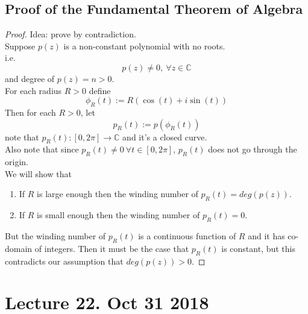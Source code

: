 \documentclass[11pt]{article}
\begin{document}
		\subsection{Proof of the Fundamental Theorem of Algebra}
		\begin{proof}
			Idea: prove by contradiction. \\
			Suppose $p(z)$ is a non-constant polynomial with no roots. \\
			i.e. 
			\[
				p(z) \neq 0,\ \forall z \in \mathbb{C}
			\]
			and degree of $p(z) = n > 0$. \\
			For each radius $R>0$ define 
			\[
				\phi_R(t) := R(\cos(t) + i \sin(t))
			\]
			Then for each $R>0$, let 
			\[
				p_R(t) := p(\phi_R(t))
			\]
			note that $p_R(t): [0, 2\pi] \to \mathbb{C}$ and it's a closed curve. \\
			Also note that since $p_R(t) \neq 0\ \forall t \in [0, 2\pi]$, $p_R(t)$ does not go through the origin. \\
			We will show that
			\begin{enumerate}
				\item If $R$ is large enough then the winding number of $p_R(t) = deg(p(z))$.
				\item If $R$ is small enough then the winding number of $p_R(t) = 0$.
			\end{enumerate}
			But the winding number of $p_R(t)$ is a continuous function of $R$ and it has co-domain of integers. Then it must be the case that $p_R(t)$ is constant, but this contradicts our assumption that $deg(p(z)) > 0$.
		\end{proof}
		
	\section{Lecture 22. Oct 31 2018}
\end{document}

